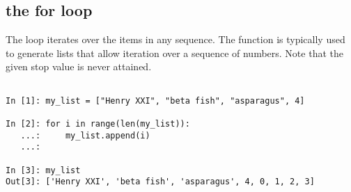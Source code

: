 \subsection*{the for loop}
\begin{example}

The  loop iterates over the items in any sequence. 
The  function is typically used to generate lists that allow iteration 
over a sequence of numbers. Note that the given stop value is never attained. 

\begin{lstlisting}

In [1]: my_list = ["Henry XXI", "beta fish", "asparagus", 4]

In [2]: for i in range(len(my_list)):
   ...:     my_list.append(i)
   ...:     

In [3]: my_list
Out[3]: ['Henry XXI', 'beta fish', 'asparagus', 4, 0, 1, 2, 3]

\end{lstlisting}
\end{example}


